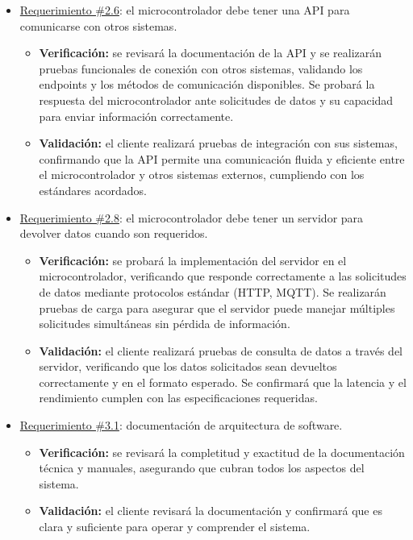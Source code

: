 \documentclass[
11pt, %
]{charter}
\begin{document}
\begin{itemize}
	\item \underline{Requerimiento \#2.6}: el microcontrolador debe tener una API para comunicarse con otros sistemas.
		\begin{itemize}
			\item \textbf{Verificación:} se  revisará la documentación de la API y se realizarán pruebas funcionales de conexión con otros sistemas, validando los endpoints y los métodos de comunicación disponibles. Se probará la respuesta del microcontrolador ante solicitudes de datos y su capacidad para enviar información correctamente.
			\item \textbf{Validación:} el cliente realizará pruebas de integración con sus sistemas, confirmando que la API permite una comunicación fluida y eficiente entre el microcontrolador y otros sistemas externos, cumpliendo con los estándares acordados.
		\end{itemize}
		
	\item \underline{Requerimiento \#2.8}: el microcontrolador debe tener un servidor para devolver datos cuando son requeridos.
		\begin{itemize}
			\item \textbf{Verificación:} se probará la implementación del servidor en el microcontrolador, verificando que responde correctamente a las solicitudes de datos mediante protocolos estándar (HTTP, MQTT). Se realizarán pruebas de carga para asegurar que el servidor puede manejar múltiples solicitudes simultáneas sin pérdida de información.
			\item \textbf{Validación:} el  cliente realizará pruebas de consulta de datos a través del servidor, verificando que los datos solicitados sean devueltos correctamente y en el formato esperado. Se confirmará que la latencia y el rendimiento cumplen con las especificaciones requeridas.
		\end{itemize}
		
	\item \underline{Requerimiento \#3.1}: documentación de arquitectura de software.
		\begin{itemize}
			\item \textbf{Verificación:} se revisará la completitud y exactitud de la documentación técnica y manuales, asegurando que cubran todos los aspectos del sistema.
			\item \textbf{Validación:} el cliente revisará la documentación y confirmará que es clara y suficiente para operar y comprender el sistema.
		\end{itemize}
		

\end{itemize}
\end{document}
